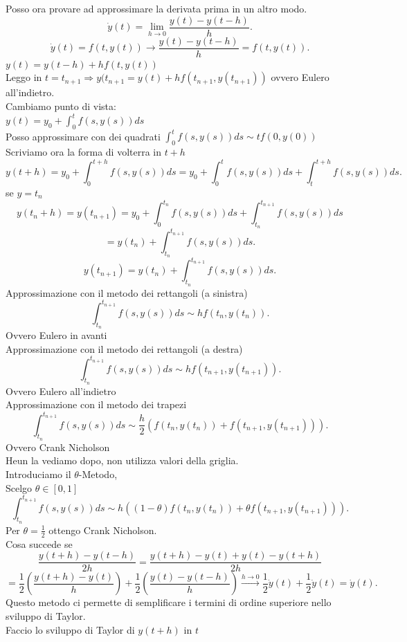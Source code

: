 \documentclass[12px]{article}
\begin{document}
	Posso ora provare ad approssimare la derivata prima in un altro modo.
	 \[
		 \dot y(t) = \lim_{ h \rightarrow 0}\frac{ y(t) - y(t-h)}h
	.\] 
	\[
		\dot y(t) = f(t,y(t)) \rightarrow \frac{y(t) - y(t-h)}h = f(t,y(t))
	.\] 
	$y(t) = y(t-h) + h f(t,y(t))$\\
	Leggo in $t = t_{n+1} \Rightarrow  y(t_{n+1} = y(t) + hf(t_{n+1},y(t_{n+1}))$ ovvero Eulero all'indietro.\\
	Cambiamo punto di vista:\\
	$y(t) = y_0 + \int_0^tf(s,y(s))ds$\\
	Posso approssimare con dei quadrati $\int_0^t f(s,y(s))ds\sim tf(0,y(0))$\\
	Scriviamo ora la forma di volterra in $t+h$
	 \[
		 y(t+h) =y_0 + \int_0^{t+h}f(s,y(s))ds = y_0 + \int_0^tf(s,y(s))ds + \int_{t}^{t+h}f(s,y(s))ds
	.\] 
	se $y = t_n$
	 \[
		 y(t_n + h) = y(t_{n+1}) = y_0 + \int_0^{t_n}f(s,y(s))ds + \int_{t_n}^{t_{n+1}}f(s,y(s))ds
	\] 
	\[
	 = y(t_n) + \int_{t_n}^{t_{n+1}}f(s,y(s))ds
	.\] 
	\[
		y(t_{n+1}) = y(t_n) + \int_{t_n}^{t_{n+1}}f(s,y(s))ds
	.\] 
	Approssimazione con il metodo dei rettangoli (a sinistra)
	\[
		\int_{t_n}^{t_{n+1}} f(s,y(s))ds\sim h f(t_n,y(t_n))
	.\] 
	Ovvero Eulero in avanti\\
	Approssimazione con il metodo dei rettangoli (a destra)
	\[
		\int_{t_n}^{t_{n+1}}f(s,y(s))ds \sim hf(t_{n+1},y(t_{n+1}))
	.\] 
	Ovvero Eulero all'indietro\\
	Approssimazione con il metodo dei trapezi
	\[
		\int_{t_n}^{t_{n+1}}f(s,y(s))ds\sim \frac h 2 (f(t_n,y(t_n)) + f(t_{n+1},y(t_{n+1})))
	.\] 
	Ovvero Crank Nicholson\\
	Heun la vediamo dopo, non utilizza valori della griglia.\\
	Introduciamo il $\theta$-Metodo,\\
	Scelgo $\theta\in [0,1]$
	 \[
		 \int_{t_n}^{t_{n+1}}f(s,y(s))ds \sim h \left((1-\theta)f(t_n,y(t_n)) + \theta f(t_{n+1},y(t_{n+1})) \right)
	.\] 
	Per $\theta = \frac 12 $ ottengo Crank Nicholson.\\
	Cosa succede se
	 \[
	 	 \frac{y(t+h) - y(t-h)}{2h} = \frac{y(t + h) - y(t) + y(t) - y(t+h)}{2h} 
	\] 
	\[
		= \frac 12 \left(\frac{y(t+h)-y(t)}h \right) + \frac 12  \left( \frac{y(t) - y(t-h)}h \right) \xrightarrow{h \rightarrow 0} \frac 12\dot y(t) + \frac 12 \dot y(t) = \dot y(t)
	.\]
	Questo metodo ci permette di semplificare i termini di ordine superiore nello sviluppo di Taylor.\\
	Faccio lo sviluppo di Taylor di $y(t+h)$ in  $t$ \\
\end{document}
